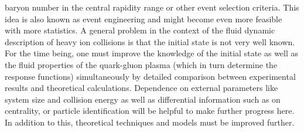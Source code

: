   baryon number  in the central rapidity range or other event selection criteria. 
This idea is also known as event engineering and might become even more feasible 
  with more statistics.
A general problem in the context of the fluid dynamic description of heavy 
  ion collisions is that the initial state is not very well known. 
For the time being,  one must improve the knowledge of the initial state 
  as well as the fluid properties of the quark-gluon plasma (which in turn 
	determine the response functions) simultaneously by detailed comparison 
	between experimental results and theoretical calculations. 
Dependence on external parameters like system size and collision energy as 
  well as differential information such as on centrality, or particle 
	identification will be helpful to make further progress here. 
In addition to this,  theoretical techniques and models must be improved further.



